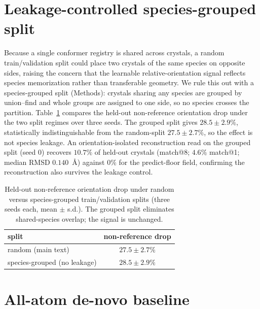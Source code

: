 \documentclass[10pt]{article}
\begin{document}
\section{Leakage-controlled species-grouped split}
\label{app:grouped}

Because a single conformer registry is shared across crystals, a random
train/validation split could place two crystals of the same species on opposite
sides, raising the concern that the learnable relative-orientation signal reflects
species memorization rather than transferable geometry. We rule this out with a
species-grouped split (Methods): crystals sharing any species are grouped by
union--find and whole groups are assigned to one side, so no species crosses the
partition. Table~\ref{tab:grouped} compares the held-out non-reference
orientation drop under the two split regimes over three seeds. The grouped split
gives $28.5\pm2.9\%$, statistically indistinguishable from the random-split
$27.5\pm2.7\%$, so the effect is not species leakage. An orientation-isolated
reconstruction read on the grouped split (seed 0) recovers $10.7\%$ of held-out
crystals (match@8; $4.6\%$ match@1; median RMSD $0.140$~\AA) against $0\%$ for the
predict-floor field, confirming the reconstruction also survives the leakage
control.

\begin{table}[h]
\centering
\caption{Held-out non-reference orientation drop under random versus
species-grouped train/validation splits (three seeds each, mean $\pm$ s.d.). The
grouped split eliminates shared-species overlap; the signal is unchanged.}
\label{tab:grouped}
\begin{tabular}{lc}
\toprule
split & non-reference drop \\
\midrule
random (main text)        & $27.5\pm2.7\%$ \\
species-grouped (no leakage) & $28.5\pm2.9\%$ \\
\bottomrule
\end{tabular}
\end{table}

\section{All-atom de-novo baseline}
\label{app:allatom}
\end{document}
